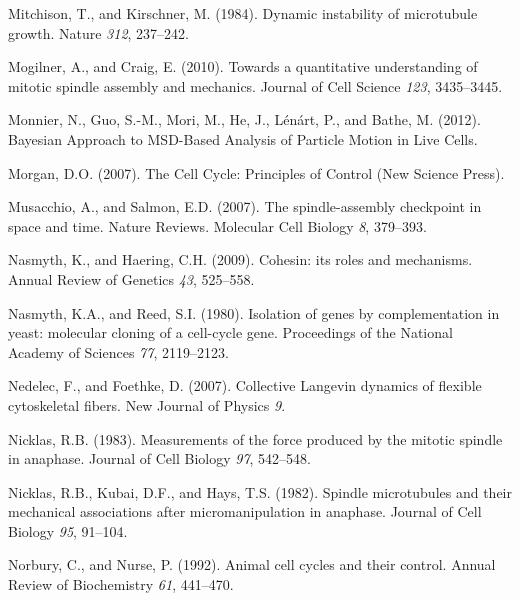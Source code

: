 \documentclass[12pt,a4paper,twoside,openright]{book}
\begin{document}
Mitchison, T., and Kirschner, M. (1984). Dynamic instability of
microtubule growth. Nature \emph{312}, 237--242.

Mogilner, A., and Craig, E. (2010). Towards a quantitative understanding
of mitotic spindle assembly and mechanics. Journal of Cell Science
\emph{123}, 3435--3445.

Monnier, N., Guo, S.-M., Mori, M., He, J., Lénárt, P., and Bathe, M.
(2012). Bayesian Approach to MSD-Based Analysis of Particle Motion in
Live Cells.

Morgan, D.O. (2007). The Cell Cycle: Principles of Control (New Science
Press).

Musacchio, A., and Salmon, E.D. (2007). The spindle-assembly checkpoint
in space and time. Nature Reviews. Molecular Cell Biology \emph{8},
379--393.

Nasmyth, K., and Haering, C.H. (2009). Cohesin: its roles and
mechanisms. Annual Review of Genetics \emph{43}, 525--558.

Nasmyth, K.A., and Reed, S.I. (1980). Isolation of genes by
complementation in yeast: molecular cloning of a cell-cycle gene.
Proceedings of the National Academy of Sciences \emph{77}, 2119--2123.

Nedelec, F., and Foethke, D. (2007). Collective Langevin dynamics of
flexible cytoskeletal fibers. New Journal of Physics \emph{9}.

Nicklas, R.B. (1983). Measurements of the force produced by the mitotic
spindle in anaphase. Journal of Cell Biology \emph{97}, 542--548.

Nicklas, R.B., Kubai, D.F., and Hays, T.S. (1982). Spindle microtubules
and their mechanical associations after micromanipulation in anaphase.
Journal of Cell Biology \emph{95}, 91--104.

Norbury, C., and Nurse, P. (1992). Animal cell cycles and their control.
Annual Review of Biochemistry \emph{61}, 441--470.
\end{document}
